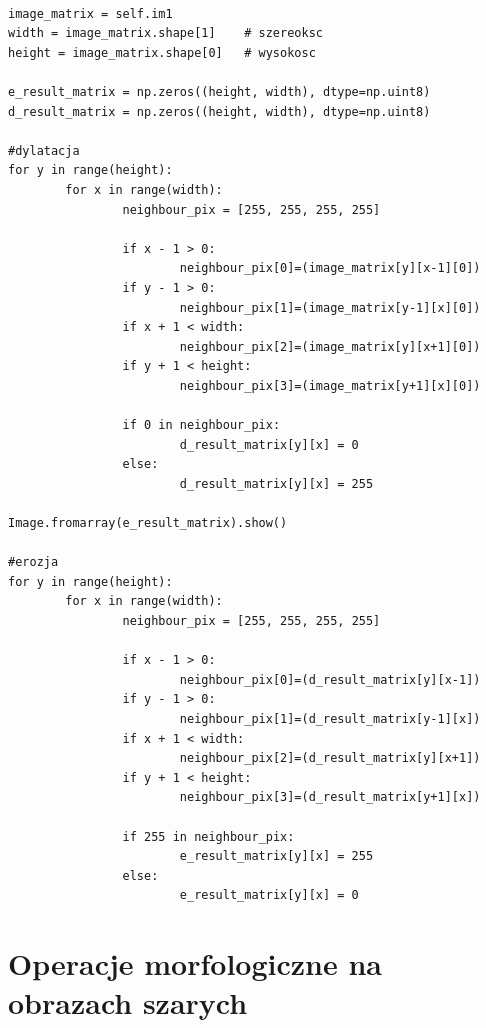 \documentclass[final,a4paper,openany,12pt]{mwbk}
\begin{document}
\begin{lstlisting}[caption= Operacja zamknięcia na obrazie binarnym]

image_matrix = self.im1
width = image_matrix.shape[1]    # szereoksc
height = image_matrix.shape[0]   # wysokosc

e_result_matrix = np.zeros((height, width), dtype=np.uint8)
d_result_matrix = np.zeros((height, width), dtype=np.uint8)

#dylatacja
for y in range(height):
        for x in range(width):  
                neighbour_pix = [255, 255, 255, 255]

                if x - 1 > 0:
                        neighbour_pix[0]=(image_matrix[y][x-1][0])
                if y - 1 > 0:
                        neighbour_pix[1]=(image_matrix[y-1][x][0])
                if x + 1 < width:
                        neighbour_pix[2]=(image_matrix[y][x+1][0])
                if y + 1 < height:
                        neighbour_pix[3]=(image_matrix[y+1][x][0])

                if 0 in neighbour_pix:
                        d_result_matrix[y][x] = 0
                else:
                        d_result_matrix[y][x] = 255

Image.fromarray(e_result_matrix).show()

#erozja
for y in range(height):
        for x in range(width):  
                neighbour_pix = [255, 255, 255, 255]

                if x - 1 > 0:
                        neighbour_pix[0]=(d_result_matrix[y][x-1])
                if y - 1 > 0:
                        neighbour_pix[1]=(d_result_matrix[y-1][x])
                if x + 1 < width:
                        neighbour_pix[2]=(d_result_matrix[y][x+1])
                if y + 1 < height:
                        neighbour_pix[3]=(d_result_matrix[y+1][x])

                if 255 in neighbour_pix:
                        e_result_matrix[y][x] = 255
                else:
                        e_result_matrix[y][x] = 0         

\end{lstlisting}


\chapter {Operacje morfologiczne na obrazach szarych}
\end{document}

